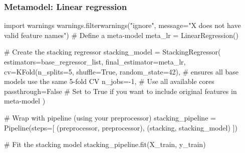 \documentclass[
  letterpaper,
  DIV=11,
  numbers=noendperiod]{scrreprt}
\newenvironment{Shaded}{\begin{snugshade}}{\end{snugshade}}
\newcommand{\CommentTok}[1]{\textcolor[rgb]{0.37,0.37,0.37}{#1}}
\newcommand{\DecValTok}[1]{\textcolor[rgb]{0.68,0.00,0.00}{#1}}
\newcommand{\ImportTok}[1]{\textcolor[rgb]{0.00,0.46,0.62}{#1}}
\newcommand{\NormalTok}[1]{\textcolor[rgb]{0.00,0.23,0.31}{#1}}
\newcommand{\OperatorTok}[1]{\textcolor[rgb]{0.37,0.37,0.37}{#1}}
\newcommand{\StringTok}[1]{\textcolor[rgb]{0.13,0.47,0.30}{#1}}
\newcommand{\VariableTok}[1]{\textcolor[rgb]{0.07,0.07,0.07}{#1}}
\begin{document}
\subsubsection{Metamodel: Linear
regression}\label{metamodel-linear-regression}

\begin{Shaded}
\begin{Highlighting}[]
\ImportTok{import}\NormalTok{ warnings}
\NormalTok{warnings.filterwarnings(}\StringTok{"ignore"}\NormalTok{, message}\OperatorTok{=}\StringTok{"X does not have valid feature names"}\NormalTok{)}
\CommentTok{\# Define a meta{-}model}
\NormalTok{meta\_lr }\OperatorTok{=}\NormalTok{ LinearRegression()}

\CommentTok{\# Create the stacking regressor}
\NormalTok{stacking\_model }\OperatorTok{=}\NormalTok{ StackingRegressor(}
\NormalTok{    estimators}\OperatorTok{=}\NormalTok{base\_regressor\_list,}
\NormalTok{    final\_estimator}\OperatorTok{=}\NormalTok{meta\_lr,}
\NormalTok{    cv}\OperatorTok{=}\NormalTok{KFold(n\_splits}\OperatorTok{=}\DecValTok{5}\NormalTok{, shuffle}\OperatorTok{=}\VariableTok{True}\NormalTok{, random\_state}\OperatorTok{=}\DecValTok{42}\NormalTok{), }\CommentTok{\# ensures all base models use the same 5{-}fold CV}
\NormalTok{    n\_jobs}\OperatorTok{={-}}\DecValTok{1}\NormalTok{,  }\CommentTok{\# Use all available cores}
\NormalTok{    passthrough}\OperatorTok{=}\VariableTok{False}  \CommentTok{\# Set to True if you want to include original features in meta{-}model}
\NormalTok{)}

\CommentTok{\# Wrap with pipeline (using your preprocessor)}
\NormalTok{stacking\_pipeline }\OperatorTok{=}\NormalTok{ Pipeline(steps}\OperatorTok{=}\NormalTok{[}
\NormalTok{    (}\StringTok{\textquotesingle{}preprocessor\textquotesingle{}}\NormalTok{, preprocessor),}
\NormalTok{    (}\StringTok{\textquotesingle{}stacking\textquotesingle{}}\NormalTok{, stacking\_model)}
\NormalTok{])}

\CommentTok{\# Fit the stacking model}
\NormalTok{stacking\_pipeline.fit(X\_train, y\_train)}
\end{Highlighting}
\end{Shaded}
\end{document}
